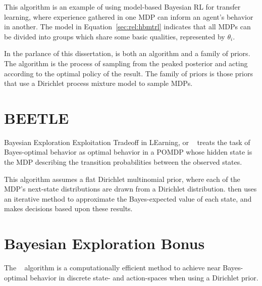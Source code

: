 This algorithm is an example of using model-based Bayesian RL for transfer learning, where experience gathered in one MDP can inform an agent's behavior in another. The model in Equation~\ref{sec:rel:hbmtrl} indicates that all MDPs can be divided into groups which share some basic qualities, represented by $\theta_i$.

In the parlance of this dissertation,  is both an algorithm and a family of priors. The algorithm is the process of sampling from the peaked posterior and acting according to the optimal policy of the result. The family of priors is those priors that use a Dirichlet process mixture model to sample MDPs.


\section{BEETLE}

Bayesian Exploration Exploitation Tradeoff in LEarning, or ~\cite{poupart06} treats the task of Bayes-optimal behavior as optimal behavior in a POMDP whose hidden state is the MDP describing the transition probabilities between the observed states.

This algorithm assumes a flat Dirichlet multinomial prior, where each of the MDP's next-state distributions are drawn from a Dirichlet distribution.  then uses an iterative method  to approximate the Bayes-expected value of each state, and makes decisions based upon these results. 





\section{Bayesian Exploration Bonus}

The ~\cite{kolter09} algorithm is a computationally efficient method to achieve near Bayes-optimal behavior in discrete state- and action-spaces when using a Dirichlet prior.

